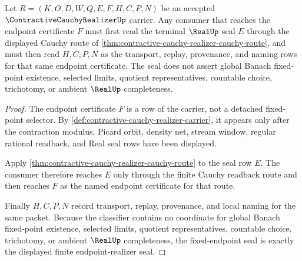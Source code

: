 \begin{theorem}
\label{thm:contractive-cauchy-realizer-fixed-endpoint-seal}
Let $R=(K,O,D,W,Q,E,F,H,C,P,N)$ be an accepted $\ContractiveCauchyRealizerUp$ carrier. Any consumer that reaches the endpoint certificate $F$ must first read the terminal $\RealUp$ seal $E$ through the displayed Cauchy route of \autoref{thm:contractive-cauchy-realizer-cauchy-route}, and must then read $H,C,P,N$ as the transport, replay, provenance, and naming rows for that same endpoint certificate. The seal does not assert global Banach fixed-point existence, selected limits, quotient representatives, countable choice, trichotomy, or ambient $\RealUp$ completeness.
\end{theorem}
\begin{proof}
The endpoint certificate $F$ is a row of the carrier, not a detached fixed-point selector. By \autoref{def:contractive-cauchy-realizer-carrier}, it appears only after the contraction modulus, Picard orbit, density net, stream window, regular rational readback, and Real seal rows have been displayed.

Apply \autoref{thm:contractive-cauchy-realizer-cauchy-route} to the seal row $E$. The consumer therefore reaches $E$ only through the finite Cauchy readback route and then reaches $F$ as the named endpoint certificate for that route.

Finally $H,C,P,N$ record transport, replay, provenance, and local naming for the same packet. Because the classifier contains no coordinate for global Banach fixed-point existence, selected limits, quotient representatives, countable choice, trichotomy, or ambient $\RealUp$ completeness, the fixed-endpoint seal is exactly the displayed finite endpoint-realizer seal.
\end{proof}



